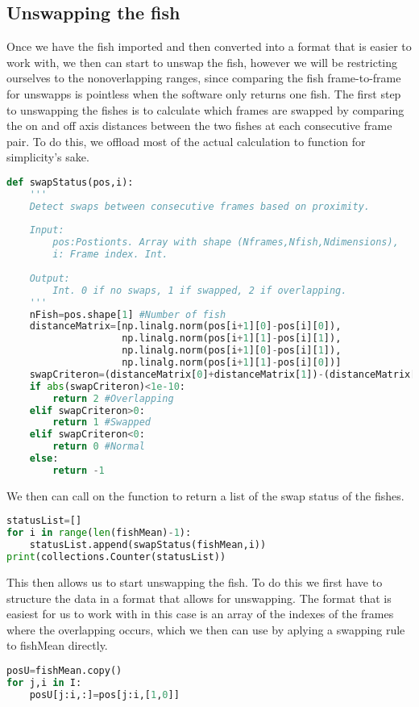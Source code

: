 \documentclass[12pt]{article}
\begin{document}
\subsection{Unswapping the fish}

Once we have the fish imported and then converted into a format that is easier to work with, we then can start to unswap the fish, however we will be restricting ourselves to the nonoverlapping ranges, since comparing the fish frame-to-frame for unswapps is pointless when the software only returns one fish. The first step to unswapping the fishes is to calculate which frames are swapped by comparing the on and off axis distances between the two fishes at each consecutive frame pair. To do this, we offload most of the actual calculation to function for simplicity's sake.
\begin{lstlisting}[language=Python]
def swapStatus(pos,i):
    '''
    Detect swaps between consecutive frames based on proximity.
    
    Input:
        pos:Postionts. Array with shape (Nframes,Nfish,Ndimensions),
        i: Frame index. Int.
    
    Output:
        Int. 0 if no swaps, 1 if swapped, 2 if overlapping.
    '''
    nFish=pos.shape[1] #Number of fish
    distanceMatrix=[np.linalg.norm(pos[i+1][0]-pos[i][0]),
                    np.linalg.norm(pos[i+1][1]-pos[i][1]),
                    np.linalg.norm(pos[i+1][0]-pos[i][1]),
                    np.linalg.norm(pos[i+1][1]-pos[i][0])]
    swapCriteron=(distanceMatrix[0]+distanceMatrix[1])-(distanceMatrix[2]+distanceMatrix[3])
    if abs(swapCriteron)<1e-10:
        return 2 #Overlapping
    elif swapCriteron>0:
        return 1 #Swapped
    elif swapCriteron<0:
        return 0 #Normal
    else:
        return -1
\end{lstlisting}

We then can call on the function to return a list of the swap status of the fishes.
\begin{lstlisting}[language=Python]
statusList=[]
for i in range(len(fishMean)-1):
    statusList.append(swapStatus(fishMean,i))
print(collections.Counter(statusList))
\end{lstlisting}

This then allows us to start unswapping the fish. To do this we first have to structure the data in a format that allows for unswapping. The format that is easiest for us to work with in this case is an array of the indexes of the frames where the overlapping occurs, which we then can use by aplying a swapping rule to fishMean directly.
\begin{lstlisting}[language=Python]
posU=fishMean.copy()
for j,i in I:
    posU[j:i,:]=pos[j:i,[1,0]]
\end{lstlisting}
\end{document}
